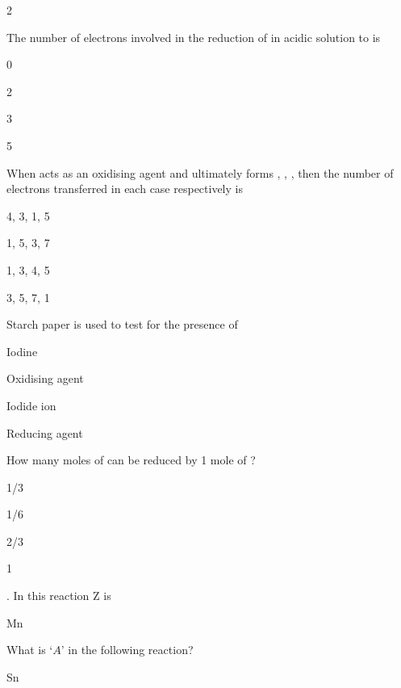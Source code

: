 \documentclass[10pt,a4paper]{article}
\begin{document}
\begin{multicols}{2}
\begin{questions}[start=1]
\item The number of electrons involved in the reduction of  in acidic solution to  is
\begin{options}
  \item 0
  \item 2
  \item 3
  \item 5
\end{options}

\item When  acts as an oxidising agent and ultimately forms , , ,  then the number of electrons transferred in each case respectively is
\begin{options}
  \item 4, 3, 1, 5
  \item 1, 5, 3, 7
  \item 1, 3, 4, 5
  \item 3, 5, 7, 1
\end{options}

\item Starch paper is used to test for the presence of
\begin{options}
  \item Iodine
  \item Oxidising agent
  \item Iodide ion
  \item Reducing agent
\end{options}

\item How many moles of  can be reduced by 1 mole of ?
\begin{options}
  \item 1/3
  \item 1/6
  \item 2/3
  \item 1
\end{options}

\item {}. In this reaction Z is
\begin{options}
  \item {}
  \item {}
  \item {}
  \item Mn
\end{options}

\item What is `$A$' in the following reaction?\\
\begin{options}
  \item {}
  \item {}
  \item {}
  \item Sn
\end{options}


\end{questions}
\end{multicols}
\end{document}
